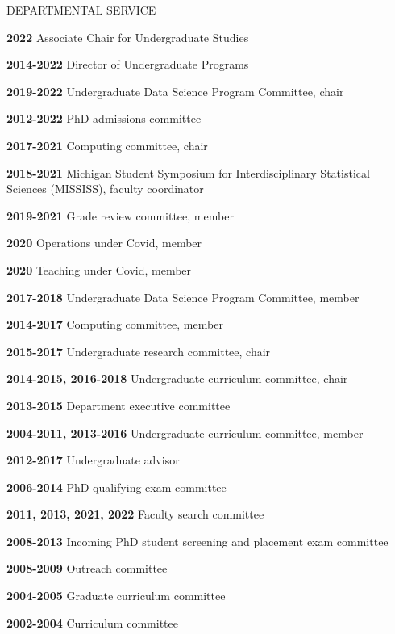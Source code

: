 
\begin{mylist}{DEPARTMENTAL SERVICE}

\item{\bf 2022 } Associate Chair for Undergraduate Studies  
\item{\bf 2014-2022 } Director of Undergraduate Programs
\item{\bf 2019-2022 } Undergraduate Data Science Program Committee, chair
\item{\bf 2012-2022 } PhD admissions committee
\item{\bf 2017-2021 } Computing committee, chair
\item{\bf 2018-2021} Michigan Student Symposium for Interdisciplinary Statistical Sciences (MISSISS), faculty coordinator
\item{\bf 2019-2021 } Grade review committee, member  
\item{\bf 2020 } Operations under Covid, member
\item{\bf 2020 } Teaching under Covid, member
\item{\bf 2017-2018 } Undergraduate Data Science Program Committee, member  
\item{\bf 2014-2017 } Computing committee, member
\item{\bf 2015-2017 } Undergraduate research committee, chair
\item{\bf 2014-2015, 2016-2018 } Undergraduate curriculum committee, chair
\item{\bf 2013-2015 } Department executive committee
\item{\bf 2004-2011, 2013-2016 } Undergraduate curriculum committee, member
\item{\bf 2012-2017 } Undergraduate advisor
\item{\bf 2006-2014 } PhD qualifying exam committee
\item{\bf 2011, 2013, 2021, 2022 } Faculty search committee
\item{\bf 2008-2013 } Incoming PhD student screening and placement exam committee
\item{\bf 2008-2009 } Outreach committee
\item{\bf 2004-2005 } Graduate curriculum committee
\item{\bf 2002-2004 } Curriculum committee 
\end{mylist}

\lsp

